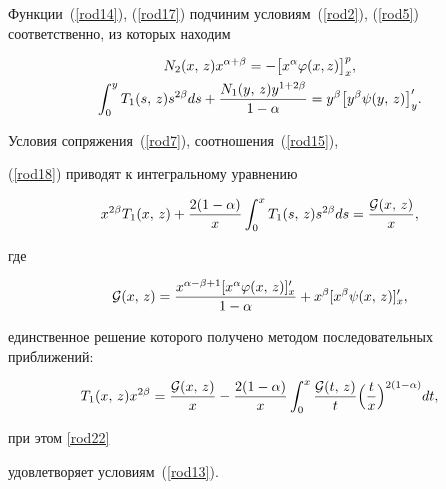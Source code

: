 Функции~(\ref{rod14}), (\ref{rod17}) подчиним условиям~(\ref{rod2}), (\ref{rod5}) соответственно, из которых находим

\begin{gather}

N_2(x,\,z)x^{\alpha+\beta}=-\bigl[x^\alpha\varphi(x,z)\bigr]^p_x,


\notag

\\

\int _0^yT_1(s,\,z)s^{2\beta}ds+\frac{N_1(y,\,z)y^{1+2\beta}}{1-\alpha}=

y^\beta \bigl[y^\beta\psi(y,\,z)\bigr]'_y . \label{rod20}

\end{gather}



Условия сопряжения~(\ref{rod7}), соотношения~(\ref{rod15}),

(\ref{rod18}) приводят к интегральному уравнению

$$

x^{2\beta}T_1(x,\,z)+\frac{2(1-\alpha)}{x}\int _0^xT_1(s,\,z)s^{2\beta}ds=

\frac{{\cal G}(x,\,z)}{x},

$$

где

\begin{equation*}

{\cal

G}(x,\,z)=\frac{x^{\alpha-\beta+1}[x^\alpha\varphi(x,\,z)]'_x}{1-\alpha}

+ x^\beta[x^\beta\psi(x,\,z)]'_x, %

\end{equation*}

единственное решение которого получено методом последовательных приближений:

\begin{equation}

T_1(x,\,z)x^{2\beta}=\frac{{\cal

G}(x,\,z)}{x}-\frac{2(1-\alpha)}{x}\int _0^x\frac{{\cal

G}(t,\,z)}{t} \Bigl(\frac{t}{x}\Bigr)^{2(1-\alpha)}dt,

\label{rod22}

\end{equation}

при этом \eqref{rod22}

удовлетворяет условиям~(\ref{rod13}).

